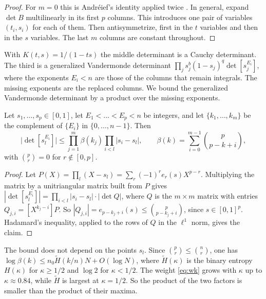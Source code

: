 \begin{proof}
For $m=0$ this is Andr\'eief's identity applied twice \cite{Forrester2018Andreief}. In general, expand
$\det B$ multilinearly in its first $p$ columns. This introduces one pair of variables $(t_i,s_i)$ for each
of them. Then antisymmetrize, first in the $t$ variables and then in the $s$ variables. The last $m$ columns
are constant throughout.
\end{proof}

With $K(t,s)=1/(1-ts)$ the middle determinant is a Cauchy determinant. The third is a generalized
Vandermonde determinant $\prod_js_j^b(1-s_j)^q\det[s_j^{E_i}]$, where the exponents $E_i<n$ are those of the
columns that remain integrals. The missing exponents are the replaced columns. We bound the generalized
Vandermonde determinant by a product over the missing exponents.

\begin{lemma}\label{lem:binomvand}
Let $s_1,\ldots,s_p\in[0,1]$, let $E_1<\dots<E_p<n$ be integers, and let $\{k_1,\ldots,k_m\}$ be the
complement of $\{E_i\}$ in $\{0,\ldots,n-1\}$. Then
\[
 \bigl|\det[s_l^{E_i}]\bigr|\le\prod_{j=1}^m\beta(k_j)\prod_{i<l}|s_i-s_l|,\qquad
 \beta(k)=\sum_{i=0}^{m-1}\binom p{p-k+i},
\]
with $\binom pr=0$ for $r\notin[0,p]$.
\end{lemma}

\begin{proof}
Let $P(X)=\prod_l(X-s_l)=\sum_r(-1)^re_r(s)X^{p-r}$. Multiplying the matrix by a unitriangular matrix built
from $P$ gives $|\det[s_l^{E_i}]|=\prod_{i<l}|s_i-s_l|\cdot|\det Q|$, where $Q$ is the $m\times m$ matrix with
entries $Q_{j,i}=[X^{k_j-i}]P$. So $|Q_{j,i}|=e_{p-k_j+i}(s)\le\binom p{p-k_j+i}$, since $s\in[0,1]^p$.
Hadamard's inequality, applied to the rows of $Q$ in the $\ell^1$ norm, gives the claim.
\end{proof}

The bound does not depend on the points $s_l$. Since $\binom pr\le\binom nr$, one has
$\log\beta(k)\le n_0\tilde H(k/n)N+O(\log N)$, where $\tilde H(\kappa)$ is the binary entropy $H(\kappa)$ for
$\kappa\ge1/2$ and $\log2$ for $\kappa<1/2$. The weight \eqref{eq:wk} grows with $\kappa$ up to
$\kappa\approx0.84$, while $\tilde H$ is largest at $\kappa=1/2$. So the product of the two factors is
smaller than the product of their maxima.

